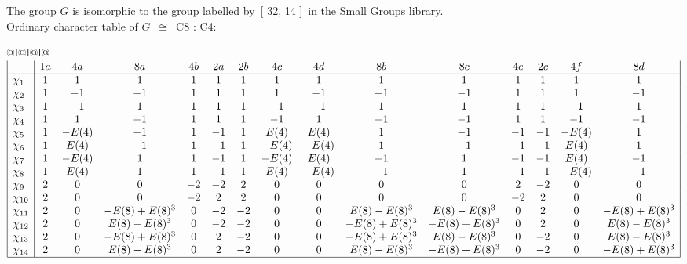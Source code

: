 \documentclass[varwidth=\maxdimen,border=10]{standalone}
\begin{document}
The group $G$ is isomorphic to the group labelled by\ [ 32, 14 ]\ in the Small Groups library.\\
Ordinary character table of $G$\ $\cong$\ C8 : C4:\\
\begin{center}
\begin{tabular}{@{}l@{}l@{}l@{}}
\hline
\(\begin{array}{|l|cccccccccccccc|}
  & 1a & 4a & 8a & 4b & 2a & 2b & 4c & 4d & 8b & 8c & 4e & 2c & 4f & 8d\\ \hline
\chi_{1} & 1 & 1 & 1 & 1 & 1 & 1 & 1 & 1 & 1 & 1 & 1 & 1 & 1 & 1\\
\chi_{2} & 1 & -1 & -1 & 1 & 1 & 1 & 1 & -1 & -1 & -1 & 1 & 1 & 1 & -1\\
\chi_{3} & 1 & -1 & 1 & 1 & 1 & 1 & -1 & -1 & 1 & 1 & 1 & 1 & -1 & 1\\
\chi_{4} & 1 & 1 & -1 & 1 & 1 & 1 & -1 & 1 & -1 & -1 & 1 & 1 & -1 & -1\\
\chi_{5} & 1 & -E(4) & -1 & 1 & -1 & 1 & E(4) & E(4) & 1 & -1 & -1 & -1 & -E(4) & 1\\
\chi_{6} & 1 & E(4) & -1 & 1 & -1 & 1 & -E(4) & -E(4) & 1 & -1 & -1 & -1 & E(4) & 1\\
\chi_{7} & 1 & -E(4) & 1 & 1 & -1 & 1 & -E(4) & E(4) & -1 & 1 & -1 & -1 & E(4) & -1\\
\chi_{8} & 1 & E(4) & 1 & 1 & -1 & 1 & E(4) & -E(4) & -1 & 1 & -1 & -1 & -E(4) & -1\\
\chi_{9} & 2 & 0 & 0 & -2 & -2 & 2 & 0 & 0 & 0 & 0 & 2 & -2 & 0 & 0\\
\chi_{10} & 2 & 0 & 0 & -2 & 2 & 2 & 0 & 0 & 0 & 0 & -2 & 2 & 0 & 0\\
\chi_{11} & 2 & 0 & -E(8)+E(8)^{3} & 0 & -2 & -2 & 0 & 0 & E(8)-E(8)^{3} & E(8)-E(8)^{3} & 0 & 2 & 0 & -E(8)+E(8)^{3}\\
\chi_{12} & 2 & 0 & E(8)-E(8)^{3} & 0 & -2 & -2 & 0 & 0 & -E(8)+E(8)^{3} & -E(8)+E(8)^{3} & 0 & 2 & 0 & E(8)-E(8)^{3}\\
\chi_{13} & 2 & 0 & -E(8)+E(8)^{3} & 0 & 2 & -2 & 0 & 0 & -E(8)+E(8)^{3} & E(8)-E(8)^{3} & 0 & -2 & 0 & E(8)-E(8)^{3}\\
\chi_{14} & 2 & 0 & E(8)-E(8)^{3} & 0 & 2 & -2 & 0 & 0 & E(8)-E(8)^{3} & -E(8)+E(8)^{3} & 0 & -2 & 0 & -E(8)+E(8)^{3}\\
\hline
\end{array}\)\\
\end{tabular}
\end{center}
\end{document}
